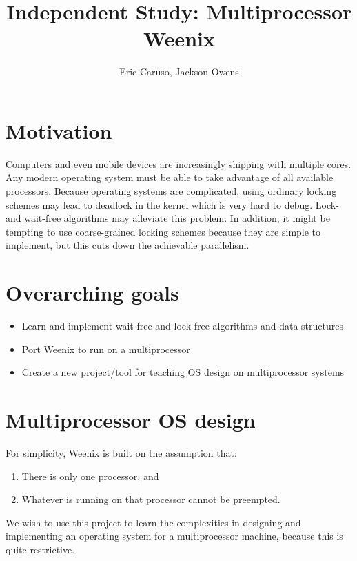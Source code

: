 \documentclass{article}
\begin{document}
\title{Independent Study: Multiprocessor Weenix}
\author{Eric Caruso, Jackson Owens}
\maketitle

\section{Motivation}

Computers and even mobile devices are increasingly shipping with multiple cores. Any modern
operating system must be able to take advantage of all available processors. Because operating
systems are complicated, using ordinary locking schemes may lead to deadlock in the kernel which
is very hard to debug. Lock- and wait-free algorithms may alleviate this problem. In addition,
it might be tempting to use coarse-grained locking schemes because they are simple to implement,
but this cuts down the achievable parallelism.

\section{Overarching goals}

\begin{itemize}
    \item Learn and implement wait-free and lock-free algorithms and data structures
    \item Port Weenix to run on a multiprocessor
    \item Create a new project/tool for teaching OS design on multiprocessor systems
\end{itemize}

\section{Multiprocessor OS design}

For simplicity, Weenix is built on the assumption that:
\begin{enumerate}
    \item There is only one processor, and
    \item Whatever is running on that processor cannot be preempted.
\end{enumerate}

We wish to use this project to learn the complexities in designing and implementing
an operating system for a multiprocessor machine, because this is quite restrictive.
\end{document}
